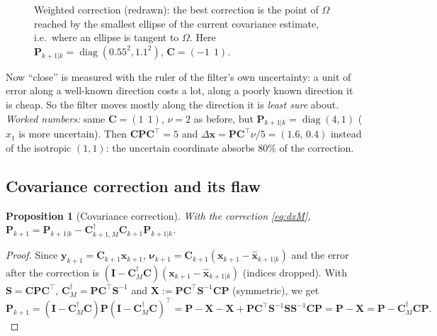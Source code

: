 \documentclass[11pt,a4paper]{article}
\newcommand{\hx}{\hat{\boldsymbol{x}}}
\newcommand{\bx}{\boldsymbol{x}}
\newcommand{\by}{\boldsymbol{y}}
\newcommand{\bnu}{\boldsymbol{\nu}}
\newcommand{\mC}{\mathbf{C}}
\newcommand{\mP}{\mathbf{P}}
\newcommand{\mS}{\mathbf{S}}
\newcommand{\mI}{\mathbf{I}}
\newcommand{\pinv}{^{\dagger}}
\newcommand{\tp}{^{\top}}
\DeclareMathOperator{\diag}{diag}
\theoremstyle{plain}
\newtheorem{proposition}[theorem]{Proposition}
\theoremstyle{definition}
\theoremstyle{remark}
\begin{document}
\begin{figure}[H]
\centering
{}
\caption{Weighted correction (redrawn): the best correction is the point of $\Omega$ reached by the smallest ellipse of the
current covariance estimate, i.e.\ where an ellipse is tangent to $\Omega$. Here $\mP_{k+1|k}=\diag(0.55^2,1.1^2)$, $\mC=(-1\ \ 1)$.}\label{fig:weighted}
\end{figure}

\begin{intuition}
Now ``close'' is measured with the ruler of the filter's own uncertainty: a unit of error along a well-known direction
costs a lot, along a poorly known direction it is cheap. So the filter moves mostly along the direction it is
\emph{least sure} about. \emph{Worked numbers:} same $\mC=(1\ \ 1)$, $\nu=2$ as before, but $\mP_{k+1|k}=\diag(4,1)$ ($x_1$ is more uncertain).
Then $\mC\mP\mC\tp=5$ and $\Delta\bx=\mP\mC\tp\nu/5=(1.6,\,0.4)$ instead of the isotropic $(1,1)$: the uncertain coordinate absorbs
$80\%$ of the correction.
\end{intuition}

\subsection{Covariance correction and its flaw}

\begin{proposition}[Covariance correction]\label{prop:covcorr}
With the correction \eqref{eq:dxM}, $\mP_{k+1}=\mP_{k+1|k}-\mC_{k+1,M}\pinv\mC_{k+1}\mP_{k+1|k}$.
\end{proposition}
\begin{proof}
Since $\by_{k+1}=\mC_{k+1}\bx_{k+1}$, $\bnu_{k+1}=\mC_{k+1}(\bx_{k+1}-\hx_{k+1|k})$ and the error after the correction is
$(\mI-\mC_M\pinv\mC)(\bx_{k+1}-\hx_{k+1|k})$ (indices dropped). With $\mS=\mC\mP\mC\tp$, $\mC_M\pinv=\mP\mC\tp\mS^{-1}$ and
$\mathbf X:=\mP\mC\tp\mS^{-1}\mC\mP$ (symmetric), we get
$\mP_{k+1}=(\mI-\mC_M\pinv\mC)\mP(\mI-\mC_M\pinv\mC)\tp=\mP-\mathbf X-\mathbf X+\mP\mC\tp\mS^{-1}\mS\mS^{-1}\mC\mP=\mP-\mathbf X=\mP-\mC_M\pinv\mC\mP.$
\end{proof}
\end{document}
